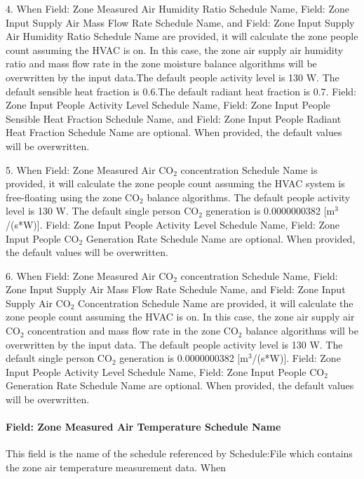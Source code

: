 \documentclass[11pt]{article}
\begin{document}
4. When Field: Zone Measured Air Humidity Ratio Schedule Name, Field: Zone Input Supply Air Mass Flow Rate Schedule Name, and Field: Zone Input Supply Air Humidity Ratio Schedule Name are provided, it will calculate the zone people count assuming the HVAC is on. In this case, the zone air supply air humidity ratio and mass flow rate in the zone moisture balance algorithms will be overwritten by the input data.The default people activity level is 130 W. The default sensible heat fraction is 0.6.The default radiant heat fraction is 0.7. Field: Zone Input People Activity Level Schedule Name, Field: Zone Input People Sensible Heat Fraction Schedule Name, and Field: Zone Input People Radiant Heat Fraction Schedule Name are optional. When provided, the default values will be overwritten.

5. When Field: Zone Measured Air CO$_2$ concentration Schedule Name is provided, it will calculate the zone people count assuming the HVAC system is free-floating using the zone CO$_2$ balance algorithms. The default people activity level is 130 W. The default single person CO$_2$ generation is 0.0000000382 [m$^3$/(s*W)]. Field: Zone Input People Activity Level Schedule Name, Field: Zone Input People CO$_2$ Generation Rate Schedule Name are optional. When provided, the default values will be overwritten.

6. When Field: Zone Measured Air CO$_2$ concentration Schedule Name, Field: Zone Input Supply Air Mass Flow Rate Schedule Name, and Field: Zone Input Supply Air CO$_2$ Concentration Schedule Name are provided, it will calculate the zone people count assuming the HVAC is on. In this case, the zone air supply air CO$_2$ concentration and mass flow rate in the zone CO$_2$ balance algorithms will be overwritten by the input data. The default people activity level is 130 W. The default single person CO$_2$ generation is 0.0000000382 [m$^3$/(s*W)]. Field: Zone Input People Activity Level Schedule Name, Field: Zone Input People CO$_2$ Generation Rate Schedule Name are optional. When provided, the default values will be overwritten.


\paragraph{Field: Zone Measured Air Temperature Schedule Name}\label{field-zone-measured-air-temperature-schedule-name-hm}
This field is the name of the schedule referenced by Schedule:File which contains the zone air temperature measurement data. When
\end{document}
